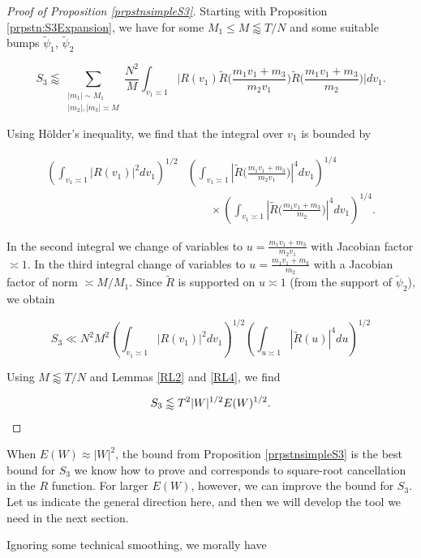 \documentclass{amsart}
\theoremstyle{plain}
\numberwithin{equation}{section}
\renewcommand{\tilde}{\widetilde}
\begin{document}
\begin{proof}[Proof of Proposition \ref{prpstnsimpleS3}] Starting with Proposition \ref{prpstn:S3Expansion}, we have for some $M_1\le M\lessapprox T/N$ and some suitable bumps $\tilde{\psi}_1$, $\tilde{\psi}_2$

\[S_3 \lessapprox  \sum_{\substack{|m_1| \sim M_1\\  |m_2|,  |m_3| \asymp M}}  \frac{N^2}{M} \int_{v_1 \asymp 1}  \Big| R ( v_1 ) \tilde{R} \Big( \frac{ m_1 v_1 + m_3}{m_2 v_1} \Big) \tilde{R} \Big( \frac{m_1 v_1 + m_3}{m_2} \Big) \Big| dv_1 . \]

Using H\"older's inequality,  we find that the integral over $v_1$ is bounded by

\begin{align*} 
 \left( \int_{v_1 \asymp 1} |R(v_1)|^2 dv_1 \right)^{1/2}&\left( \int_{v_1 \asymp 1} \left|  \tilde{R} \Big( \frac{ m_1 v_1 + m_3}{m_2 v_1} \Big) \right|^4 dv_1  \right)^{1/4}\\
&\qquad \times  \left( \int_{v_1 \asymp 1} \left|  \tilde{R}  \Big( \frac{m_1 v_1 + m_3}{m_2} \Big) \right|^4 dv_1   \right)^{1/4}. 
\end{align*}

In the second integral we change of variables to $u = \frac{m_1 v_1 + m_3}{m_2 v_1}$ with Jacobian factor $\asymp 1$.   In the third integral change of variables to $u = \frac{m_1 v_1 + m_3}{m_2}$ with a Jacobian factor of norm $\asymp  M / M_1$. Since $\tilde{R}$ is supported on $u\asymp 1$ (from the support of $\tilde{\psi}_2$), we obtain

\[S_3 \ll N^2 M^2  \left( \int_{v_1 \asymp 1} |R(v_1)|^2 dv_1 \right)^{1/2} \left( \int_{u \asymp 1} |\tilde{R} (u) |^4 du  \right)^{1/2}  \]


Using $M \lessapprox T/N$ and Lemmas \ref{RL2} and \ref{RL4},  we find

\[ S_3 \lessapprox T^2 |W|^{1/2} E(W)^{1/2} .\qedhere \]

\end{proof}

%
%

When $E(W)\approx |W|^2$,  the bound from Proposition \ref{prpstnsimpleS3} is the best bound for $S_3$ we know how to prove and corresponds to square-root cancellation in the $R$ function.  For larger $E(W)$, however, we can improve the bound for $S_3$.   Let us indicate the general direction here,  and then we will develop the tool we need in the next section.

Ignoring some technical smoothing,  we morally have
\end{document}
